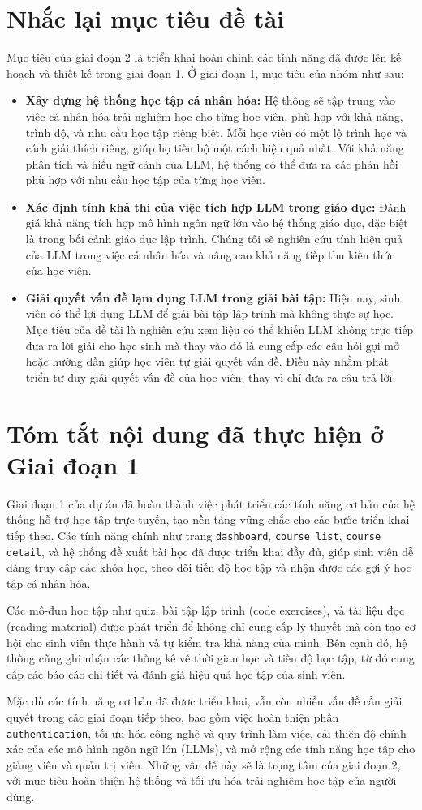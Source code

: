 \section{Nhắc lại mục tiêu đề tài}
Mục tiêu của giai đoạn 2 là triển khai hoàn chỉnh các tính năng đã được lên kế hoạch và thiết kế trong giai đoạn 1. Ở giai đoạn 1, mục tiêu của nhóm như sau:
\begin{itemize}
    \item \textbf{Xây dựng hệ thống học tập cá nhân hóa: }Hệ thống sẽ tập trung vào việc cá nhân hóa trải nghiệm học cho từng học viên, phù hợp với khả năng, trình độ, và nhu cầu học tập riêng biệt. Mỗi học viên có một lộ trình học và cách giải thích riêng, giúp họ tiến bộ một cách hiệu quả nhất. Với khả năng phân tích và hiểu ngữ cảnh của LLM, hệ thống có thể đưa ra các phản hồi phù hợp với nhu cầu học tập của từng học viên.
    \item \textbf{Xác định tính khả thi của việc tích hợp LLM trong giáo dục: }Đánh giá khả năng tích hợp mô hình ngôn ngữ lớn vào hệ thống giáo dục, đặc biệt là trong bối cảnh giáo dục lập trình. Chúng tôi sẽ nghiên cứu tính hiệu quả của LLM trong việc cá nhân hóa và nâng cao khả năng tiếp thu kiến thức của học viên.
    \item \textbf{Giải quyết vấn đề lạm dụng LLM trong giải bài tập: }Hiện nay, sinh viên có thể lợi dụng LLM để giải bài tập lập trình mà không thực sự học. Mục tiêu của đề tài là nghiên cứu xem liệu có thể khiến LLM không trực tiếp đưa ra lời giải cho học sinh mà thay vào đó là cung cấp các câu hỏi gợi mở hoặc hướng dẫn giúp học viên tự giải quyết vấn đề. Điều này nhằm phát triển tư duy giải quyết vấn đề của học viên, thay vì chỉ đưa ra câu trả lời.
\end{itemize}
\section{Tóm tắt nội dung đã thực hiện ở Giai đoạn 1}
Giai đoạn 1 của dự án đã hoàn thành việc phát triển các tính năng cơ bản của hệ thống hỗ trợ học tập trực tuyến, tạo nền tảng vững chắc cho các bước triển khai tiếp theo. Các tính năng chính như trang \texttt{dashboard}, \texttt{course list}, \texttt{course detail}, và hệ thống đề xuất bài học đã được triển khai đầy đủ, giúp sinh viên dễ dàng truy cập các khóa học, theo dõi tiến độ học tập và nhận được các gợi ý học tập cá nhân hóa.

Các mô-đun học tập như quiz, bài tập lập trình (code exercises), và tài liệu đọc (reading material) được phát triển để không chỉ cung cấp lý thuyết mà còn tạo cơ hội cho sinh viên thực hành và tự kiểm tra khả năng của mình. Bên cạnh đó, hệ thống cũng ghi nhận các thống kê về thời gian học và tiến độ học tập, từ đó cung cấp các báo cáo chi tiết và đánh giá hiệu quả học tập của sinh viên.

Mặc dù các tính năng cơ bản đã được triển khai, vẫn còn nhiều vấn đề cần giải quyết trong các giai đoạn tiếp theo, bao gồm việc hoàn thiện phần \texttt{authentication}, tối ưu hóa công nghệ và quy trình làm việc, cải thiện độ chính xác của các mô hình ngôn ngữ lớn (LLMs), và mở rộng các tính năng học tập cho giảng viên và quản trị viên. Những vấn đề này sẽ là trọng tâm của giai đoạn 2, với mục tiêu hoàn thiện hệ thống và tối ưu hóa trải nghiệm học tập của người dùng.
